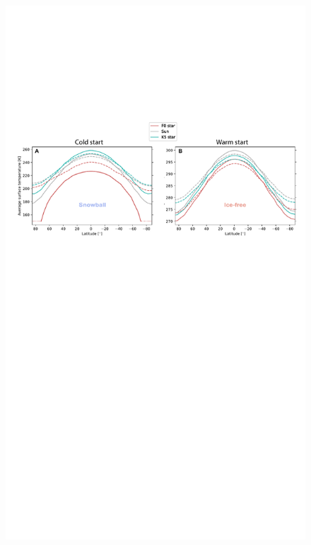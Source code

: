 \documentclass[fleqn,usenatbib]{mnras}
\begin{document}
\begin{figure}
 \includegraphics[width=\textwidth]{Figures/Comparison_a0_rev.pdf}

\end{figure}
\end{document}
